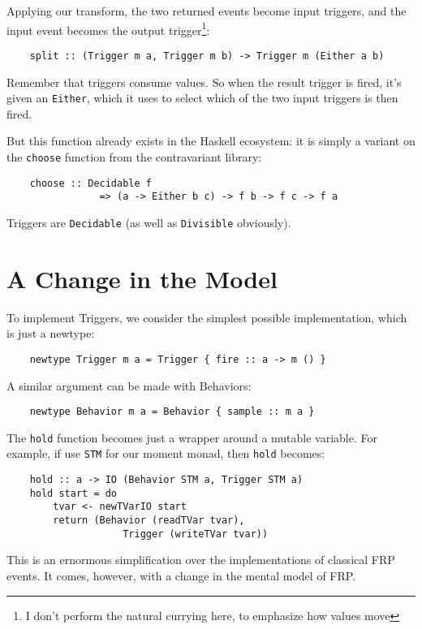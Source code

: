 \documentclass{article}
\begin{document}
Applying our transform, the two returned events become input triggers,
and the input event becomes the output trigger\footnote{I don't perform
the natural currying here, to emphasize how values move}:

\begin{verbatim}
    split :: (Trigger m a, Trigger m b) -> Trigger m (Either a b)
\end{verbatim}

Remember that triggers consume values.  So when the result trigger is
fired, it's given an \verb|Either|, which it uses to select which of the
two input triggers is then fired.

But this function already exists in the Haskell ecosystem: it is simply
a variant on the \verb|choose| function from the contravariant library:

\begin{verbatim}
    choose :: Decidable f
                => (a -> Either b c) -> f b -> f c -> f a
\end{verbatim}

Triggers are \verb|Decidable| (as well as \verb|Divisible| obviously).

\section{A Change in the Model}

To implement Triggers, we consider the simplest possible implementation,
which is just a newtype:

\begin{verbatim}
    newtype Trigger m a = Trigger { fire :: a -> m () }
\end{verbatim}

A similar argument can be made with Behaviors:
\begin{verbatim}
    newtype Behavior m a = Behavior { sample :: m a }
\end{verbatim}

The \verb|hold| function becomes just a wrapper around a mutable
variable.  For example, if use \verb|STM| for our moment monad, then
\verb|hold| becomes:

\begin{verbatim}
    hold :: a -> IO (Behavior STM a, Trigger STM a)
    hold start = do
        tvar <- newTVarIO start
        return (Behavior (readTVar tvar),
                    Trigger (writeTVar tvar))
\end{verbatim}


This is an ernormous simplification over the implementations of
classical FRP events.  It comes, however, with a change in the mental
model of FRP.
\end{document}
